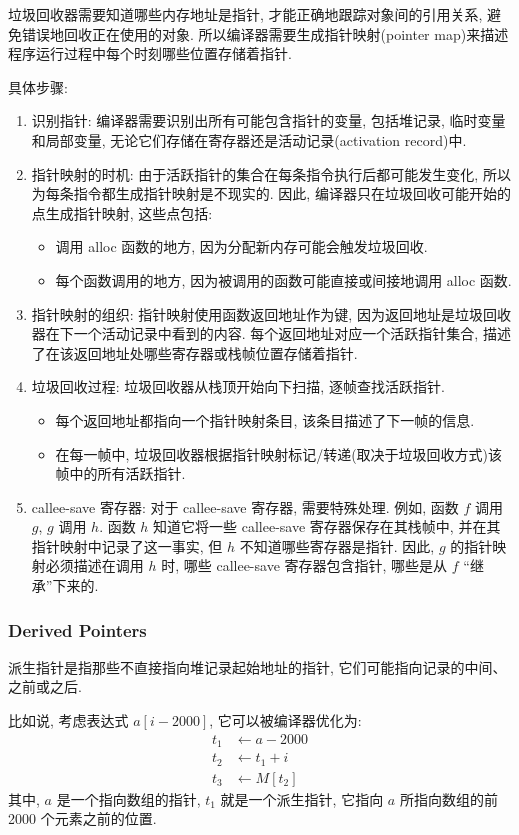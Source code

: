 垃圾回收器需要知道哪些内存地址是指针, 才能正确地跟踪对象间的引用关系, 避免错误地回收正在使用的对象. 所以编译器需要生成指针映射(pointer map)来描述程序运行过程中每个时刻哪些位置存储着指针. 

具体步骤:
\begin{enumerate}
    \item 识别指针: 编译器需要识别出所有可能包含指针的变量, 包括堆记录, 临时变量和局部变量, 无论它们存储在寄存器还是活动记录(activation record)中. 
    \item 指针映射的时机: 由于活跃指针的集合在每条指令执行后都可能发生变化, 所以为每条指令都生成指针映射是不现实的. 因此, 编译器只在垃圾回收可能开始的点生成指针映射, 这些点包括:
    \begin{itemize}
        \item 调用 alloc 函数的地方, 因为分配新内存可能会触发垃圾回收. 
        \item 每个函数调用的地方, 因为被调用的函数可能直接或间接地调用 alloc 函数. 
    \end{itemize}
    \item 指针映射的组织: 指针映射使用函数返回地址作为键, 因为返回地址是垃圾回收器在下一个活动记录中看到的内容. 每个返回地址对应一个活跃指针集合, 描述了在该返回地址处哪些寄存器或栈帧位置存储着指针. 
    \item 垃圾回收过程: 垃圾回收器从栈顶开始向下扫描, 逐帧查找活跃指针. 
    \begin{itemize}
        \item 每个返回地址都指向一个指针映射条目, 该条目描述了下一帧的信息. 
        \item 在每一帧中, 垃圾回收器根据指针映射标记/转递(取决于垃圾回收方式)该帧中的所有活跃指针. 
    \end{itemize}
    \item callee-save 寄存器: 对于 callee-save 寄存器, 需要特殊处理. 
    \subitem 例如, 函数 $f$ 调用 $g$, $g$ 调用 $h$. 函数 $h$ 知道它将一些 callee-save 寄存器保存在其栈帧中, 并在其指针映射中记录了这一事实, 但 $h$ 不知道哪些寄存器是指针. 因此, $g$ 的指针映射必须描述在调用 $h$ 时, 哪些 callee-save 寄存器包含指针, 哪些是从 $f$ “继承”下来的.
\end{enumerate}


\subsubsection{Derived Pointers}
派生指针是指那些不直接指向堆记录起始地址的指针, 它们可能指向记录的中间、之前或之后. 


比如说, 考虑表达式 $a[i-2000]$, 它可以被编译器优化为: 
\begin{align*}
    t_1 &\leftarrow a - 2000\\
    t_2 &\leftarrow t_1 + i \\
    t_3 &\leftarrow M[t_2]
\end{align*}
其中, $a$ 是一个指向数组的指针, $t_1$ 就是一个派生指针, 它指向 $a$ 所指向数组的前 2000 个元素之前的位置. 

